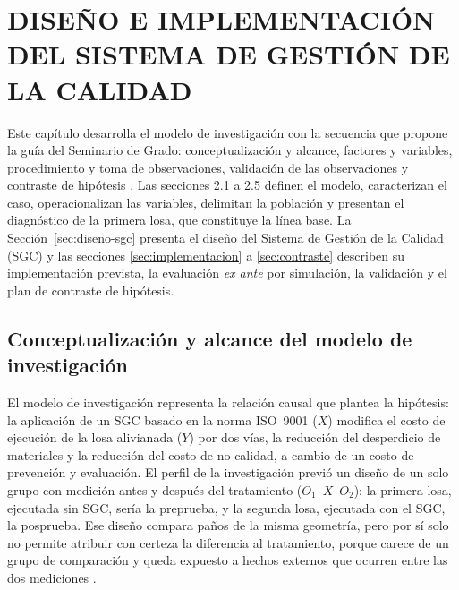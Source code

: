 \chapter{DISEÑO E IMPLEMENTACIÓN DEL SISTEMA DE GESTIÓN DE LA CALIDAD}
\label{cap:diseno}

Este capítulo desarrolla el modelo de investigación con la secuencia que propone la guía del Seminario de Grado: conceptualización y alcance, factores y variables, procedimiento y toma de observaciones, validación de las observaciones y contraste de hipótesis \parencite{barrios2021modelo}. Las secciones 2.1 a 2.5 definen el modelo, caracterizan el caso, operacionalizan las variables, delimitan la población y presentan el diagnóstico de la primera losa, que constituye la línea base. La Sección~\ref{sec:diseno-sgc} presenta el diseño del Sistema de Gestión de la Calidad (SGC) y las secciones \ref{sec:implementacion} a \ref{sec:contraste} describen su implementación prevista, la evaluación \emph{ex ante} por simulación, la validación y el plan de contraste de hipótesis.

\section{Conceptualización y alcance del modelo de investigación}
\label{sec:conceptualizacion}

El modelo de investigación representa la relación causal que plantea la hipótesis: la aplicación de un SGC basado en la norma ISO~9001 ($X$) modifica el costo de ejecución de la losa alivianada ($Y$) por dos vías, la reducción del desperdicio de materiales y la reducción del costo de no calidad, a cambio de un costo de prevención y evaluación. El perfil de la investigación previó un diseño de un solo grupo con medición antes y después del tratamiento ($O_1$--$X$--$O_2$): la primera losa, ejecutada sin SGC, sería la preprueba, y la segunda losa, ejecutada con el SGC, la posprueba. Ese diseño compara paños de la misma geometría, pero por sí solo no permite atribuir con certeza la diferencia al tratamiento, porque carece de un grupo de comparación y queda expuesto a hechos externos que ocurren entre las dos mediciones \parencite[p.~163]{hernandez2018}.


